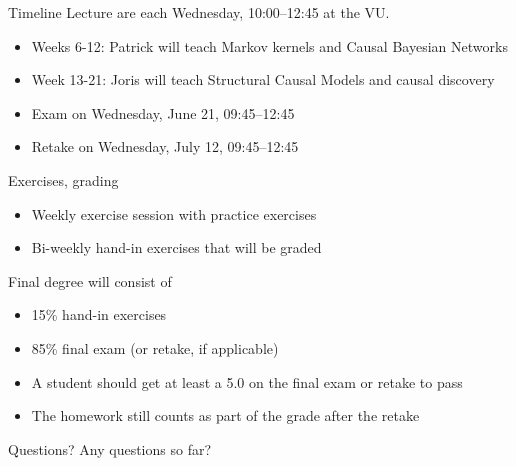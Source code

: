 \begin{frame}{Timeline}
  Lecture are each Wednesday, 10:00--12:45 at the VU.
  \begin{itemize}
    \item Weeks 6-12: Patrick will teach Markov kernels and Causal Bayesian Networks
    \item Week 13-21: Joris will teach Structural Causal Models and causal discovery
    \item Exam on Wednesday, June 21, 09:45--12:45
    \item Retake on Wednesday, July 12, 09:45--12:45
  \end{itemize}

\end{frame}

\begin{frame}{Exercises, grading}
  \begin{itemize}
    \item Weekly exercise session with practice exercises
    \item Bi-weekly hand-in exercises that will be graded
  \end{itemize}

  \bigskip
  Final degree will consist of
  \begin{itemize}
    \item 15\% hand-in exercises
    \item 85\% final exam (or retake, if applicable)
    \item A student should get at least a 5.0 on the final exam or retake to pass
    \item The homework still counts as part of the grade after the retake
  \end{itemize}
\end{frame}

\begin{frame}{Questions?}
  Any questions so far?
\end{frame}
